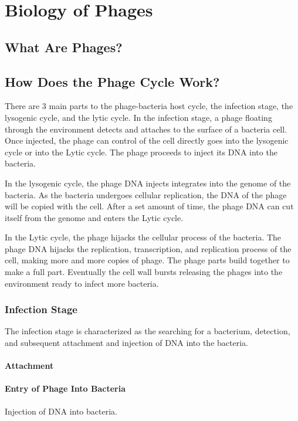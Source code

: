 \section{Biology of Phages}
\subsection{What Are Phages?}

\subsection{How Does the Phage Cycle Work?}
There are 3 main parts to the phage-bacteria host cycle, the infection stage, the lysogenic cycle, and the lytic cycle. 
In the infection stage, a phage floating through the environment detects and attaches to the surface of a bacteria cell. 
Once injected, the phage can control of the cell directly goes into the lysogenic cycle or into the Lytic cycle. 
The phage proceeds to inject its DNA into the bacteria. 
\newline 

In the lysogenic cycle, the phage DNA injects integrates into the genome of the bacteria. 
As the bacteria undergoes cellular replication, the DNA of the phage will be copied with the cell. 
After a set amount of time, the phage DNA can cut itself from the genome and enters the Lytic cycle.
\newline 

In the Lytic cycle, the phage hijacks the cellular process of the bacteria. 
The phage DNA hijacks the replication, transcription, and replication process of the cell, making more and more copies of phage. 
The phage parts build together to make a full part. 
Eventually the cell wall bursts releasing the phages into the environment ready to infect more bacteria. 

\subsubsection{Infection Stage}
The infection stage is characterized as the searching for a bacterium, detection, and subsequent attachment and injection of DNA into the bacteria. 
\paragraph{Attachment}


\paragraph{Entry of Phage Into Bacteria}
Injection of DNA into bacteria. 

